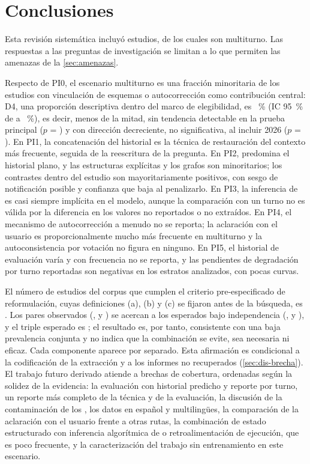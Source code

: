 \section{Conclusiones}
\label{sec:conclusiones}

Esta revisión sistemática incluyó \nEstudios{} estudios, de los cuales \nMultiturno{} son multiturno. Las respuestas a las preguntas de investigación se limitan a lo que permiten las amenazas de la \cref{sec:amenazas}.

Respecto de PI0, el escenario multiturno es una fracción minoritaria de los estudios con vinculación de esquemas o autocorrección como contribución central: D4, una proporción descriptiva dentro del marco de elegibilidad, es \DcuatroPct~\% (IC 95~\% de \DcuatroICinf{} a \DcuatroICsup~\%), es decir, menos de la mitad, sin tendencia detectable en la prueba principal ($p$ = \DcuatroTendenciaP{}) y con dirección decreciente, no significativa, al incluir 2026 ($p$ = \tendenciaConP{}). En PI1, la concatenación del historial es la técnica de restauración del contexto más frecuente, seguida de la reescritura de la pregunta. En PI2, predomina el historial plano, y las estructuras explícitas y los grafos son minoritarios; los contrastes dentro del estudio son mayoritariamente positivos, con sesgo de notificación posible y confianza que baja al penalizarlo. En PI3, la inferencia de  es casi siempre implícita en el modelo, aunque la comparación con un turno no es válida por la diferencia en los valores no reportados o no extraídos. En PI4, el mecanismo de autocorrección a menudo no se reporta; la aclaración con el usuario es proporcionalmente mucho más frecuente en multiturno y la autoconsistencia por votación no figura en ninguno. En PI5, el historial de evaluación varía y con frecuencia no se reporta, y las pendientes de degradación por turno reportadas son negativas en los estratos analizados, con pocas curvas.

El número de estudios del corpus que cumplen el criterio pre-especificado de reformulación, cuyas definiciones (a), (b) y (c) se fijaron antes de la búsqueda, es \nBrechaMocho{}. Los pares observados (\nMochoAB{}, \nMochoAC{} y \nMochoBC{}) se acercan a los esperados bajo independencia (\espMochoAB{}, \espMochoAC{} y \espMochoBC{}), y el triple esperado es \espMochoABC{}; el resultado es, por tanto, consistente con una baja prevalencia conjunta y no indica que la combinación se evite, sea necesaria ni eficaz. Cada componente aparece por separado. Esta afirmación es condicional a la codificación de la extracción y a los informes no recuperados (\cref{sec:dis-brecha}). El trabajo futuro derivado atiende a brechas de cobertura, ordenadas según la solidez de la evidencia: la evaluación con historial predicho y reporte por turno, un reporte más completo de la técnica y de la evaluación, la discusión de la contaminación de los , los datos en español y multilingües, la comparación de la aclaración con el usuario frente a otras rutas, la combinación de estado estructurado con inferencia algorítmica de  o retroalimentación de ejecución, que es poco frecuente, y la caracterización del trabajo sin entrenamiento en este escenario.
